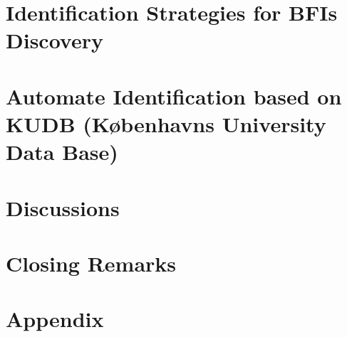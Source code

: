 \documentclass[]{report}
\begin{document}
%

%


%
\chapter{Identification Strategies for BFIs Discovery}


\chapter{Automate Identification based on KUDB (Københavns University Data Base)}

\chapter{Discussions}

\chapter{Closing Remarks}
\section{}

\chapter{Appendix}



\printbibliography
\end{document}
